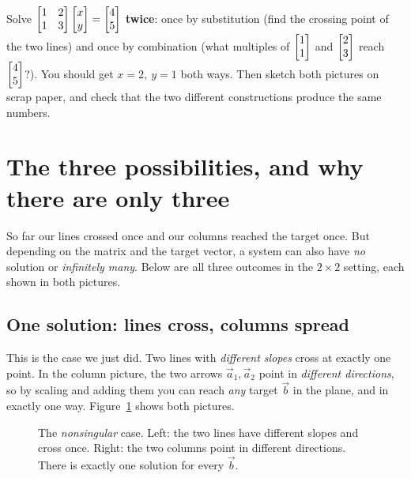 \begin{labbox}
Solve $\begin{bmatrix}1 & 2\\1 & 3\end{bmatrix}\begin{bmatrix}x\\y\end{bmatrix}=\begin{bmatrix}4\\5\end{bmatrix}$ \textbf{twice}:
once by substitution (find the crossing point of the two lines) and once by
combination (what multiples of $\begin{bmatrix}1\\1\end{bmatrix}$ and $\begin{bmatrix}2\\3\end{bmatrix}$ reach
$\begin{bmatrix}4\\5\end{bmatrix}$?). You should get $x=2,\ y=1$ both ways. Then sketch both
pictures on scrap paper, and check that the two different constructions
produce the same numbers.
\end{labbox}

\section{The three possibilities, and why there are only three}
\label{ch06:sec-three}

So far our lines crossed once and our columns reached the target once. But
depending on the matrix and the target vector, a system can also have
\emph{no} solution or \emph{infinitely many}. Below are all three outcomes
in the $2\times 2$ setting, each shown in both pictures.

\subsection{One solution: lines cross, columns spread}

This is the case we just did. Two lines with \emph{different slopes} cross
at exactly one point. In the column picture, the two arrows
$\vec a_1,\vec a_2$ point in \emph{different directions}, so by scaling and
adding them you can reach \emph{any} target $\vec b$ in the plane, and in
exactly one way. Figure~\ref{ch06:one} shows both pictures.

\begin{figure}[H]
\centering
{}
\caption{The \emph{nonsingular} case. Left: the two lines have different
slopes and cross once. Right: the two columns point in different directions.
There is exactly one solution for every $\vec b$.}
\label{ch06:one}
\end{figure}

